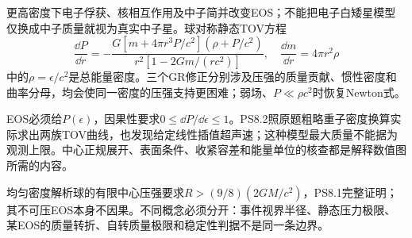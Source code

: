 更高密度下电子俘获、核相互作用及中子简并改变EOS；不能把电子白矮星模型仅换成中子质量就视为真实中子星。球对称静态TOV方程
\[
 \frac{\dd P}{\dd r}=
 -\frac{G[m+4\pi r^3P/c^2](\rho+P/c^2)}
 {r^2[1-2Gm/(rc^2)]},\quad
 \frac{\dd m}{\dd r}=4\pi r^2\rho
\]
中的$\rho=\epsilon/c^2$是总能量密度。三个GR修正分别涉及压强的质量贡献、惯性密度和曲率分母，均会使同一密度的压强支持更困难；弱场、$P\ll\rho c^2$时恢复Newton式。

EOS必须给$P(\epsilon)$，因果性要求$0\le\dd P/\dd\epsilon\le1$。PS8.2照原题粗略重子密度换算实际求出两族TOV曲线，也发现给定线性插值超声速；这种模型最大质量不能据为观测上限。中心正规展开、表面条件、收紧容差和能量单位的核查都是解释数值图所需的内容。

均匀密度解析球的有限中心压强要求$R>(9/8)(2GM/c^2)$，PS8.1完整证明；其不可压EOS本身不因果。不同概念必须分开：事件视界半径、静态压力极限、某EOS的质量转折、自转质量极限和稳定性判据不是同一条边界。
